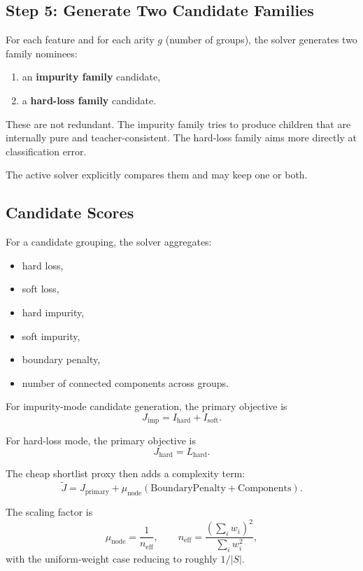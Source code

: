 \documentclass[11pt]{article}
\begin{document}
\subsection{Step 5: Generate Two Candidate Families}

For each feature and for each arity \(g\) (number of groups), the solver generates two family nominees:

\begin{enumerate}
\item an \textbf{impurity family} candidate,
\item a \textbf{hard-loss family} candidate.
\end{enumerate}

These are not redundant. The impurity family tries to produce children that are internally pure and teacher-consistent. The hard-loss family aims more directly at classification error.

The active solver explicitly compares them and may keep one or both.

\subsection{Candidate Scores}

For a candidate grouping, the solver aggregates:

\begin{itemize}
\item hard loss,
\item soft loss,
\item hard impurity,
\item soft impurity,
\item boundary penalty,
\item number of connected components across groups.
\end{itemize}

For impurity-mode candidate generation, the primary objective is
\[
J_{\mathrm{imp}} = I_{\mathrm{hard}} + I_{\mathrm{soft}}.
\]

For hard-loss mode, the primary objective is
\[
J_{\mathrm{hard}} = L_{\mathrm{hard}}.
\]

The cheap shortlist proxy then adds a complexity term:
\[
\widetilde{J}
=
J_{\mathrm{primary}}
+
\mu_{\mathrm{node}}
\left(
\mathrm{BoundaryPenalty}
+
\mathrm{Components}
\right).
\]

The scaling factor is
\[
\mu_{\mathrm{node}}
=
\frac{1}{n_{\mathrm{eff}}},
\qquad
n_{\mathrm{eff}}
=
\frac{(\sum_i w_i)^2}{\sum_i w_i^2},
\]
with the uniform-weight case reducing to roughly \(1 / |S|\).
\end{document}
